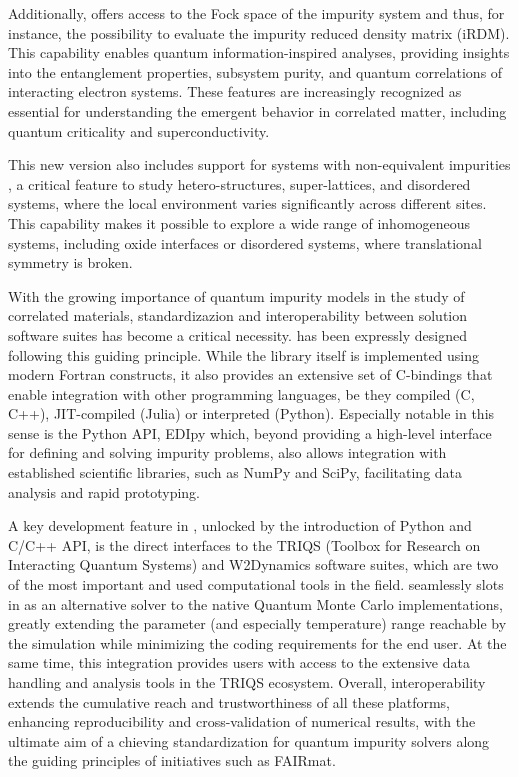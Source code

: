 \documentclass[edipack_sp.tex]{subfiles}
\begin{document}
Additionally, \NAME offers access to the Fock space of
the impurity system and thus, for instance, the possibility to
evaluate the impurity reduced density matrix
(iRDM). This capability enables quantum information-inspired analyses, providing insights into the entanglement properties, subsystem purity, and quantum correlations of interacting electron systems. These
features are increasingly recognized as essential for understanding the emergent behavior in correlated matter, including quantum criticality and superconductivity.

This new version also includes support for systems with non-equivalent impurities , a critical feature to study hetero-structures, super-lattices, and disordered systems, where the local environment varies significantly across different sites. This capability makes it 
possible to explore a wide range of inhomogeneous systems, including
oxide interfaces or disordered systems, where
translational symmetry is broken.


With the growing importance of  quantum impurity models in the study of correlated materials,
standardizazion and interoperability between solution software suites has
become a critical necessity.
\NAME has been expressly designed following this guiding principle. 
While the library itself is implemented using modern Fortran constructs, it also provides an extensive set of C-bindings that enable integration with other programming languages,
be they compiled (C, C++), JIT-compiled (Julia) or interpreted (Python). 
Especially notable in this sense is the Python API, EDIpy which, beyond providing a 
high-level interface for defining and solving impurity problems, also allows integration with established scientific libraries, such as NumPy and SciPy, facilitating data analysis and
rapid prototyping.

A key development feature in \NAME, unlocked by the introduction of Python and C/C++ API, 
is the direct interfaces to the TRIQS (Toolbox for Research on Interacting Quantum Systems) and
W2Dynamics software suites, which are two of the most important and used computational tools in
the field. \NAME seamlessly slots in as an alternative solver to the native Quantum Monte Carlo 
implementations, greatly extending the parameter (and especially temperature) range reachable by 
the simulation while minimizing the coding requirements for the end user.
At the same time, this integration provides \NAME users with access to the
extensive data handling and analysis tools in the TRIQS ecosystem. 
Overall, interoperability extends the cumulative reach and trustworthiness of all these platforms,
enhancing reproducibility and cross-validation of numerical results, with the ultimate aim of a
chieving standardization for quantum impurity solvers along the guiding principles of initiatives such as FAIRmat.
\end{document}
